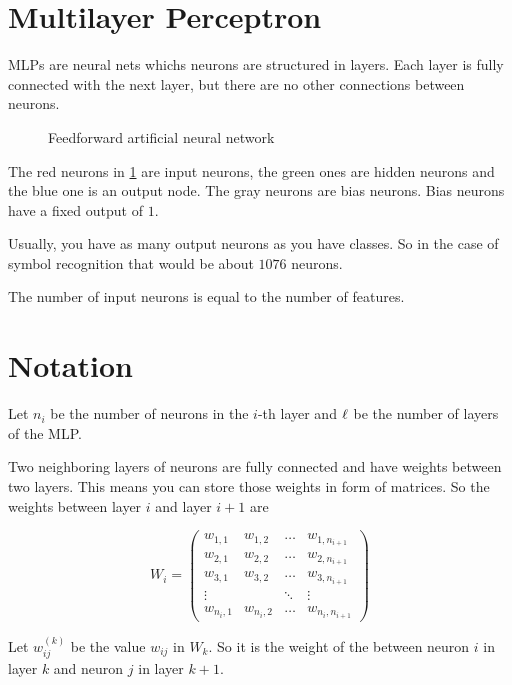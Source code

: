 \section{Multilayer Perceptron}\label{ch:Content2:sec:Section2}

\Glspl{MLP} are neural nets whichs neurons are structured in layers.
Each layer is fully connected with the next layer, but there are no other
connections between neurons.

\begin{figure}[ht]
    \centering
    
    \caption{Feedforward artificial neural network}
    \label{fig:feedforward}
\end{figure}

The red neurons in \cref{fig:feedforward} are input neurons, the green ones are
hidden neurons and the blue one is an output node. The gray neurons are bias neurons.
Bias neurons have a fixed output of $1$.

Usually, you have as many output neurons as you have classes. So in the case of
symbol recognition that would be about $\si{1076}$ neurons.

The number of input neurons is equal to the number of features.

\section{Notation}
Let $n_i$ be the number of neurons in the $i$-th layer and ${\ell}$ be the
number of layers of the \gls{MLP}.

Two neighboring layers of neurons are fully connected and have weights between
two layers. This means you can store those weights in form of matrices.
So the weights between layer $i$ and layer $i+1$ are

\[W_i = \begin{pmatrix}
    w_{1,1} & w_{1,2} & \dots & w_{1,n_{i+1}}\\
    w_{2,1} & w_{2,2} & \dots & w_{2,n_{i+1}}\\
    w_{3,1} & w_{3,2} & \dots & w_{3,n_{i+1}}\\
    \vdots  &         & \ddots& \vdots \\
    w_{n_{i},1} & w_{n_{i},2} & \dots & w_{n_{i},n_{i+1}}
\end{pmatrix}\]

Let $w_{ij}^{(k)}$ be the value $w_{ij}$ in $W_k$. So it is the weight of the
between neuron $i$ in layer $k$ and neuron $j$ in layer $k+1$.

